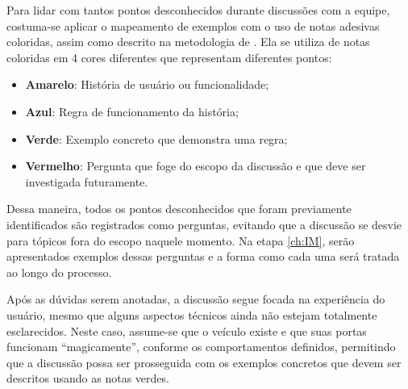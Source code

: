Para lidar com tantos pontos desconhecidos durante discussões com a equipe, costuma-se aplicar o mapeamento de exemplos com o uso de notas adesivas coloridas, 
assim como descrito na metodologia de . Ela se utiliza de notas coloridas em 4 cores diferentes que representam diferentes pontos:

\begin{itemize}
	\item \textbf{Amarelo}: História de usuário ou funcionalidade;
	\item \textbf{Azul}: Regra de funcionamento da história;
	\item \textbf{Verde}: Exemplo concreto que demonstra uma regra;
	\item \textbf{Vermelho}: Pergunta que foge do escopo da discussão e que deve ser investigada futuramente.
\end{itemize}

Dessa maneira, todos os pontos desconhecidos que foram previamente identificados são registrados como perguntas, evitando que a discussão se desvie para tópicos 
fora do escopo naquele momento. Na etapa \ref{ch:IM}, serão apresentados exemplos dessas perguntas e a forma como cada uma será tratada ao longo do processo.

Após as dúvidas serem anotadas, a discussão segue focada na experiência do usuário, mesmo que alguns aspectos técnicos ainda não estejam totalmente esclarecidos. 
Neste caso, assume-se que o veículo existe e que suas portas funcionam “magicamente”, conforme os comportamentos definidos, permitindo que a discussão possa ser 
prosseguida com os exemplos concretos que devem ser descritos usando as notas verdes.





